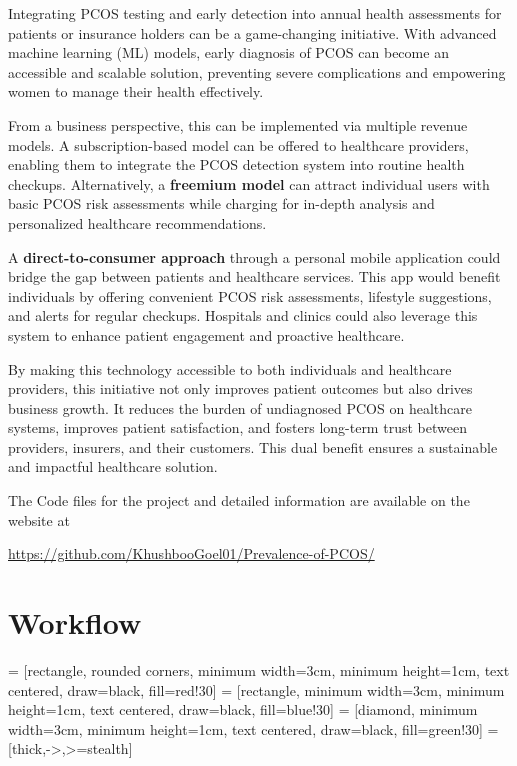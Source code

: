\documentclass{article}
\begin{document}
Integrating PCOS testing and early detection into annual health assessments for patients or insurance holders can be a game-changing initiative. With advanced machine learning (ML) models, early diagnosis of PCOS can become an accessible and scalable solution, preventing severe complications and empowering women to manage their health effectively.

From a business perspective, this can be implemented via multiple revenue models. A subscription-based model can be offered to healthcare providers, enabling them to integrate the PCOS detection system into routine health checkups. Alternatively, a \textbf{freemium model} can attract individual users with basic PCOS risk assessments while charging for in-depth analysis and personalized healthcare recommendations. 

A \textbf{direct-to-consumer approach} through a personal mobile application could bridge the gap between patients and healthcare services. This app would benefit individuals by offering convenient PCOS risk assessments, lifestyle suggestions, and alerts for regular checkups. Hospitals and clinics could also leverage this system to enhance patient engagement and proactive healthcare.

By making this technology accessible to both individuals and healthcare providers, this initiative not only improves patient outcomes but also drives business growth. It reduces the burden of undiagnosed PCOS on healthcare systems, improves patient satisfaction, and fosters long-term trust between providers, insurers, and their customers. This dual benefit ensures a sustainable and impactful healthcare solution.


The Code files for the project and detailed information are available on
the website at
\begin{center}
  \url{https://github.com/KhushbooGoel01/Prevalence-of-PCOS/}
\end{center}

\section{Workflow}


\usetikzlibrary{shapes.geometric, arrows, positioning, fit}

 = [rectangle, rounded corners, minimum width=3cm, minimum height=1cm, text centered, draw=black, fill=red!30]
 = [rectangle, minimum width=3cm, minimum height=1cm, text centered, draw=black, fill=blue!30]
 = [diamond, minimum width=3cm, minimum height=1cm, text centered, draw=black, fill=green!30]
 = [thick,->,>=stealth]
\end{document}
